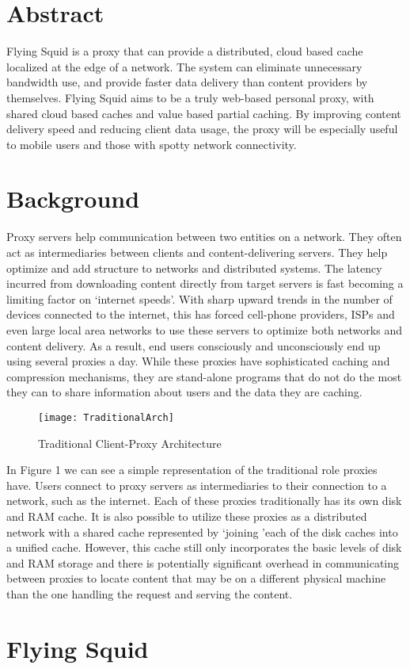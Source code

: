 \section{Abstract}

Flying Squid is a proxy that can provide a distributed, cloud based cache localized at the edge of a network. The system can eliminate unnecessary bandwidth use, and provide faster data delivery than content providers by themselves. Flying Squid aims to be a truly web-based personal proxy, with shared cloud based caches and value based partial caching. By improving content delivery speed and reducing client data usage, the proxy will be especially useful to mobile users and those with spotty network connectivity.

\section{Background}

Proxy servers help communication between two entities on a network. They often act as intermediaries between clients and content-delivering servers. They help optimize and add structure to networks and distributed systems. The latency incurred from downloading content directly from target servers is fast becoming a limiting factor on ‘internet speeds’. With sharp upward trends in the number of devices connected to the internet, this has forced cell-phone providers, ISPs and even large local area networks to use these servers to optimize both networks and content delivery. As a result, end users consciously and unconsciously end up using several proxies a day. While these proxies have sophisticated caching and compression mechanisms, they are stand-alone programs that do not do the most they can to share information about users and the data they are caching.

\begin{figure}[H] \centering
\texttt{[image: TraditionalArch]}
\caption{Traditional Client-Proxy Architecture}
\end{figure}


In Figure 1 we can see a simple representation of the traditional role proxies have. Users connect to proxy servers as intermediaries to their connection to a network, such as the internet. Each of these proxies traditionally has its own disk and RAM cache. It is also possible to utilize these proxies as a distributed network with a shared cache represented by \lq joining \rq each of the disk caches into a unified cache. However, this cache still only incorporates the basic levels of disk and RAM storage and there is potentially significant overhead in communicating between proxies to locate content that may be on a different physical machine than the one handling the request and serving the content.



\section{Flying Squid}

